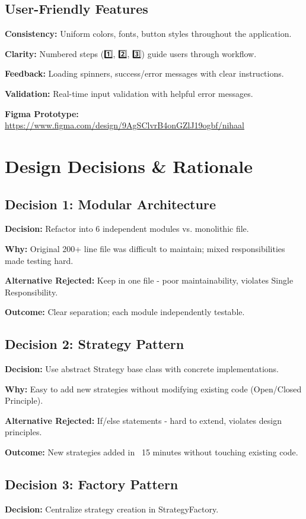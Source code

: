 \documentclass[11pt,a4paper]{article}
\begin{document}
\subsection{User-Friendly Features}
\textbf{Consistency:} Uniform colors, fonts, button styles throughout the application.

\textbf{Clarity:} Numbered steps (1️⃣, 2️⃣, 3️⃣) guide users through workflow.

\textbf{Feedback:} Loading spinners, success/error messages with clear instructions.

\textbf{Validation:} Real-time input validation with helpful error messages.

\textbf{Figma Prototype:} \url{https://www.figma.com/design/9AgSClvrB4onGZlJ19ogbf/nihaal}

\section{Design Decisions \& Rationale}

\subsection{Decision 1: Modular Architecture}
\textbf{Decision:} Refactor into 6 independent modules vs. monolithic file.

\textbf{Why:} Original 200+ line file was difficult to maintain; mixed responsibilities made testing hard.

\textbf{Alternative Rejected:} Keep in one file - poor maintainability, violates Single Responsibility.

\textbf{Outcome:} Clear separation; each module independently testable.

\subsection{Decision 2: Strategy Pattern}
\textbf{Decision:} Use abstract Strategy base class with concrete implementations.

\textbf{Why:} Easy to add new strategies without modifying existing code (Open/Closed Principle).

\textbf{Alternative Rejected:} If/else statements - hard to extend, violates design principles.

\textbf{Outcome:} New strategies added in ~15 minutes without touching existing code.

\subsection{Decision 3: Factory Pattern}
\textbf{Decision:} Centralize strategy creation in StrategyFactory.
\end{document}
